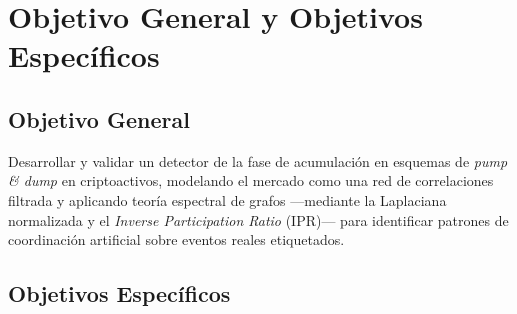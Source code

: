 \section{Objetivo General y Objetivos Específicos}

\subsection{Objetivo General}

Desarrollar y validar un detector de la fase de acumulación en esquemas de
\emph{pump \& dump} en criptoactivos, modelando el mercado como una red de
correlaciones filtrada y aplicando teoría espectral de grafos ---mediante la
Laplaciana normalizada y el \emph{Inverse Participation Ratio} (IPR)--- para
identificar patrones de coordinación artificial sobre eventos reales etiquetados.

\subsection{Objetivos Específicos}


